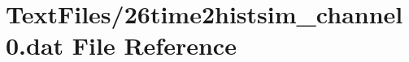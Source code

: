 \hypertarget{26time2histsim__channel0_8dat}{}\section{Text\+Files/26time2histsim\+\_\+channel0.dat File Reference}
\label{26time2histsim__channel0_8dat}
